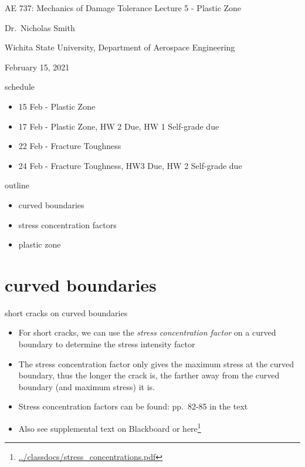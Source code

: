 \documentclass[
  letterpaper,
  ignorenonframetext,
  aspectratio=43,
  handout,
  12pt]{beamer}
\author{}
\date{}
\DeclareRobustCommand{\href}[2]{#2\footnote{\url{#1}}}
\providecommand{\tightlist}{%
  \setlength{\itemsep}{0pt}\setlength{\parskip}{0pt}}
\providecommand{\tightlist}{%
\setlength{\itemsep}{0pt}\setlength{\parskip}{0pt}}
\begin{document}
\begin{frame}{AE 737: Mechanics of Damage Tolerance}
\protect\hypertarget{ae-737-mechanics-of-damage-tolerance}{}
Lecture 5 - Plastic Zone

Dr.~Nicholas Smith

Wichita State University, Department of Aerospace Engineering

February 15, 2021
\end{frame}

\begin{frame}{schedule}
\protect\hypertarget{schedule}{}
\begin{itemize}
\tightlist
\item
  15 Feb - Plastic Zone
\item
  17 Feb - Plastic Zone, HW 2 Due, HW 1 Self-grade due
\item
  22 Feb - Fracture Toughness
\item
  24 Feb - Fracture Toughness, HW3 Due, HW 2 Self-grade due
\end{itemize}
\end{frame}

\begin{frame}{outline}
\protect\hypertarget{outline}{}
\begin{itemize}
\tightlist
\item
  curved boundaries
\item
  stress concentration factors
\item
  plastic zone
\end{itemize}
\end{frame}

\hypertarget{curved-boundaries}{%
\section{curved boundaries}\label{curved-boundaries}}

\begin{frame}{short cracks on curved boundaries}
\protect\hypertarget{short-cracks-on-curved-boundaries}{}
\begin{itemize}
\tightlist
\item
  For short cracks, we can use the \emph{stress concentration factor} on
  a curved boundary to determine the stress intensity factor
\item
  The stress concentration factor only gives the maximum stress at the
  curved boundary, thus the longer the crack is, the farther away from
  the curved boundary (and maximum stress) it is.
\item
  Stress concentration factors can be found: pp.~82-85 in the text
\item
  Also see supplemental text on Blackboard or
  \href{../classdocs/stress_concentrations.pdf}{here}
\end{itemize}
\end{frame}
\end{document}
